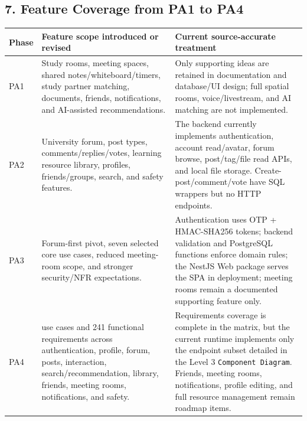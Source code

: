 \documentclass[12pt]{article}
\renewcommand{\baselinestretch}{1.5}
\begin{document}
\subsection*{7. Feature Coverage from PA1 to PA4}
\par\medskip

\begingroup
\small
\renewcommand{\baselinestretch}{1.0}\selectfont
\renewcommand{\arraystretch}{1.15}
\setlength{\tabcolsep}{6pt}
\begin{longtable}{|>{\raggedright\arraybackslash}p{}|>{\raggedright\arraybackslash}p{}|>{\raggedright\arraybackslash}p{}|}
\hline
\textbf{Phase} & \textbf{Feature scope introduced or revised} & \textbf{Current source-accurate treatment} \\ \hline
\endhead
PA1 & Study rooms, meeting spaces, shared notes/whiteboard/timers, study partner matching, documents, friends, notifications, and AI-assisted recommendations. & Only supporting ideas are retained in documentation and database/UI design; full spatial rooms, voice/livestream, and AI matching are not implemented. \\ \hline
PA2 & University forum, post types, comments/replies/votes, learning resource library, profiles, friends/groups, search, and safety features. & The backend currently implements authentication, account read/avatar, forum browse, post/tag/file read APIs, and local file storage. Create-post/comment/vote have SQL wrappers but no HTTP endpoints. \\ \hline
PA3 & Forum-first pivot, seven selected core use cases, reduced meeting-room scope, and stronger security/NFR expectations. & Authentication uses OTP + HMAC-SHA256 tokens; backend validation and PostgreSQL functions enforce domain rules; the NestJS Web package serves the SPA in deployment; meeting rooms remain a documented supporting feature only. \\ \hline
PA4 & 34 use cases and 241 functional requirements across authentication, profile, forum, posts, interaction, search/recommendation, library, friends, meeting rooms, notifications, and safety. & Requirements coverage is complete in the matrix, but the current runtime implements only the endpoint subset detailed in the Level 3 \texttt{Component Diagram}. Friends, meeting rooms, notifications, profile editing, and full resource management remain roadmap items. \\ \hline
\end{longtable}
\endgroup
\par\medskip
\end{document}
